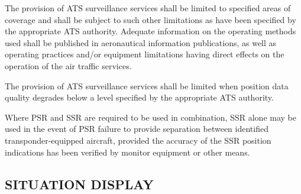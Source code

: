 \begin{enumnoss}
    \item The provision of ATS surveillance services shall be limited to specified areas of coverage and shall be subject to such other limitations as have been specified by the appropriate ATS authority. Adequate information on the operating methods used shall be published in aeronautical information publications, as well as operating practices and/or equipment limitations having direct effects on the operation of the air traffic services.

    \begin{enumnoss}
        \item The provision of ATS surveillance services shall be limited when position data quality degrades below a level specified by the appropriate ATS authority.
    \end{enumnoss}

    \item Where PSR and SSR are required to be used in combination, SSR alone may be used in the event of PSR failure to provide separation between identified transponder-equipped aircraft, provided the accuracy of the SSR position indications has been verified by monitor equipment or other means.
\end{enumnoss}

\subsection[Situation display]{SITUATION DISPLAY}

